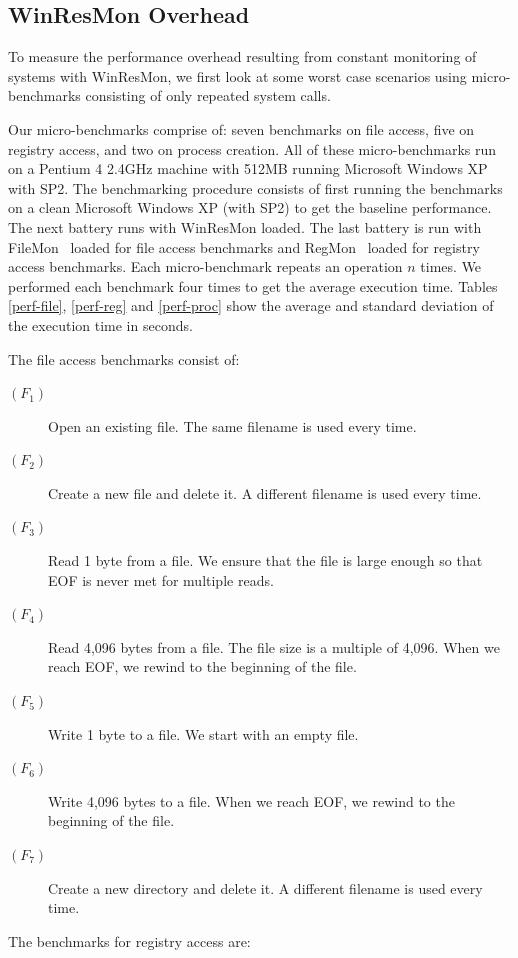 \subsection{WinResMon Overhead}

To measure the performance overhead resulting from constant
monitoring of systems with WinResMon,  we first look at some
worst case scenarios using micro-benchmarks consisting of only
repeated system calls.

Our micro-benchmarks comprise of: seven benchmarks on file access, five on registry access, and
two on process creation.  All of these micro-benchmarks run on a
Pentium 4 2.4GHz machine with 512MB running Microsoft Windows XP with SP2.
The benchmarking procedure consists of first running the benchmarks on a 
clean Microsoft Windows XP (with SP2) to get the baseline performance. The 
next battery runs with WinResMon loaded. The last battery is run with 
FileMon~\cite{filemon} loaded for file access benchmarks and RegMon~\cite{regmon} 
loaded for registry access benchmarks. Each micro-benchmark repeats an operation $n$ times. 
We performed each benchmark four times to get the average execution time.
Tables \ref{perf-file}, \ref{perf-reg} and \ref{perf-proc} show the average and standard 
deviation of the execution time in seconds.

The file access benchmarks consist of:

\begin{description}
\item[$(F_1)$] Open an existing file.  The same filename is used every time.
\item[$(F_2)$] Create a new file and delete it.  A different filename is used
every time. 
\item[$(F_3)$] Read 1 byte from a file. We ensure that the file is large
enough so that EOF is never met for multiple reads.
\item[$(F_4)$] Read 4,096 bytes from a file.  The file size is a multiple of
4,096. When we reach EOF, we rewind to the beginning of the file.
\item[$(F_5)$] Write 1 byte to a file.  We start with an empty file.
\item[$(F_6)$] Write 4,096 bytes to a file.  When we reach EOF, we rewind to
the beginning of the file. 
\item[$(F_7)$] Create a new directory and delete it. A different filename is
used every time. 
\end{description}

The benchmarks for registry access are:

